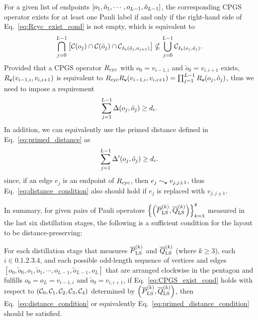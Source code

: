 \documentclass[
 prx,
 reprint,
 superscriptaddress,
 longbibliography,
 dvipsnames
]{revtex4-2}
\begin{document}
For a given list of endpoints $\qty[o_1, \tilde{o}_1, \cdots, o_{L-1}, \tilde{o}_{L-1}]$, the corresponding CPGS operator exists for at least one Pauli label if and only if the right-hand side of Eq.~\eqref{eq:Rcyc_exist_cond} is not empty, which is equivalent to
\begin{align}
    \bigcap_{j=0}^{L-1} \qty[\mathcal{C}\qty(o_j) \cap \mathcal{C}\qty(\tilde{o}_j) \cap \mathcal{C}_{I_{\mathrm{b}}\qty(\tilde{o}_j, o_{j+1})}] \nsubseteq \bigcup_{j=0}^{L-1} \mathcal{C}_{I_{\mathrm{b}}\qty(o_j, \tilde{o}_j)}.
    \label{eq:CPGS_exist_cond}
\end{align}
Provided that a CPGS operator $R_{\mathrm{cyc}}$ with $o_0 = v_{i-1,i}$ and $\tilde{o}_0 = v_{i,i+1}$ exists, $R_{\texttt{w}}\qty(v_{i-1, i}, v_{i,i+1})$ is equivalent to $R_{\mathrm{cyc}} R_{\texttt{w}}\qty(v_{i-1,i}, v_{i,i+1}) = \prod_{j=1}^{L-1} R_{\texttt{w}}\qty(o_j, \tilde{o}_j)$, thus we need to impose a requirement
\begin{align}
    \sum_{j=1}^{L-1} \Delta\qty(o_j,\tilde{o}_j)  \geq d_i.
    \label{eq:distance_condition}
\end{align}
In addition, we can equivalently use the primed distance defined in Eq.~\eqref{eq:primed_distance} as
\begin{align}
    \sum_{j=1}^{L-1} \Delta'\qty(o_j,\tilde{o}_j)  \geq d_i.
    \label{eq:primed_distance_condition}
\end{align}
since, if an edge $e_j$ is an endpoint of $R_{\mathrm{cyc}}$, then $e_j \sim_{\texttt{w}} v_{j,j\pm1}$, thus Eq.~\eqref{eq:distance_condition} also should hold if $e_j$ is replaced with $v_{j,j\pm1}$.

In summary, for given pairs of Pauli operators $\qty{\qty(\overline{P}^{(k)}_{\mathrm{LS}}, \overline{Q}^{(k)}_{\mathrm{LS}})}_{k=3}^8$ measured in the last six distillation stages, the following is a sufficient condition for the layout to be distance-preserving:
\begin{condition}
    For each distillation stage that measures $\overline{P}^{(k)}_{\mathrm{LS}}$ and $\overline{Q}^{(k)}_{\mathrm{LS}}$ (where $k \geq 3$), each $i \in \qty{0, 1, 2, 3, 4}$, and each possible odd-length sequence of vertices and edges $\left[o_0, \tilde{o}_0, o_1, \tilde{o}_1, \cdots, o_{L-1}, \tilde{o}_{L-1}, o_L \right]$ that are arranged clockwise in the pentagon and fulfills $o_0=o_L=v_{i-1,i}$ and $\tilde{o}_0=v_{i,i+1}$, if Eq.~\eqref{eq:CPGS_exist_cond} holds with respect to $\qty(\mathcal{C}_{0}, \mathcal{C}_{1}, \mathcal{C}_{2}, \mathcal{C}_{3}, \mathcal{C}_{4})$ determined by $\qty(\overline{P}^{(k)}_{\mathrm{LS}}, \overline{Q}^{(k)}_{\mathrm{LS}})$, then Eq.~\eqref{eq:distance_condition} or equivalently Eq.~\eqref{eq:primed_distance_condition} should be satisfied.
    \label{cond:dist_layout_condition}
\end{condition}
\end{document}
